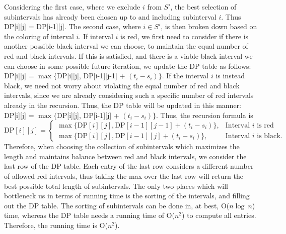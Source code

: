\begin{solution}
    Considering the first case, where we exclude $i$ from $S'$, the best selection of subintervals has already been chosen up to and including subinterval $i$. Thus DP[i][j] = DP[i-1][j]. The second case, where $i \in S'$, is then broken down based on the coloring of interval $i$. If interval $i$ is red, we first need to consider if there is another possible black interval we can choose, to maintain the equal number of red and black intervals. If this is satisfied, and there is a viable black interval we can choose in some possible future iteration, we update the DP table as follows: DP[i][j] = $\max \{$DP[i][j], DP[i-1][j-1] + $(t_i - s_i)\}$. If the interval $i$ is instead black, we need not worry about violating the equal number of red and black intervals, since we are already considering such a specific number of red intervals already in the recursion. Thus, the DP table will be updated in this manner: DP[i][j] = $\max \{$DP[i][j], DP[i-1][j] + $(t_i - s_i) \}$. Thus, the recursion formula is 
\[
\text{DP}[i][j] = \begin{cases}
    \max \{ \text{DP}[i][j], \text{DP}[i-1][j-1] + (t_i - s_i) \}, & \text{Interval } i \text{ is red} \\
    \max \{ \text{DP}[i][j], \text{DP}[i-1][j] + (t_i - s_i) \}, & \text{Interval } i \text{ is black}.
\end{cases}
\]
\hop
Therefore, when choosing the collection of subintervals which maximizes the length and maintains balance between red and black intervals, we consider the last row of the DP table. Each entry of the last row considers a different number of allowed red intervals, thus taking the max over the last row will return the best possible total length of subintervals. The only two places which will bottleneck us in terms of running time is the sorting of the intervals, and filling out the DP table. The sorting of subintervals can be done in, at best, O($n\log \ n$) time, whereas the DP table needs a running time of O($n^2$) to compute all entries. Therefore, the running time is O($n^2$). 
\end{solution}

\newpage
